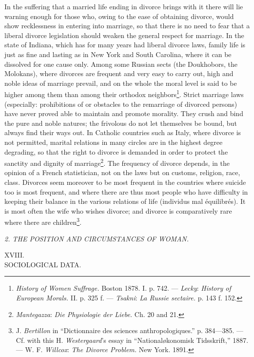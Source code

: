 \documentclass[12pt,a4paper,openany]{book}
\newcommand{\opage}[1]{\marginnote{\footnotesize\textit{[#1]}}}
\newcommand{\grouphead}[1]{\bigskip\begin{center}{\large #1}\end{center}}
\newcounter{etikch}
\newcommand{\chapterhead}[2]{\stepcounter{etikch}\bigskip\begin{center}\pdfbookmark[1]{#1 #2}{etikch.\arabic{etikch}}#1\\[3pt]{\large #2}\end{center}\medskip}
\begin{document}
In the suffering that a married life ending in divorce brings with it there will lie warning enough for those who, owing
to the ease of obtaining divorce, would show recklessness in entering into marriage, so that there is no need to fear
that a liberal divorce legislation should weaken the general respect for marriage. In the state of Indiana, which has
for many years had liberal divorce laws, family life is just as fine and lasting as in New York and South Carolina,
where it can be dissolved for one cause only. Among some Russian sects (the Doukhobors, the Molokans), where divorces are
frequent and very easy to carry out, high and noble ideas of marriage prevail, and on the whole the moral level is said
to be higher among them than among their orthodox neighbors\footnote[1]{\textit{History of Women Suffrage.} Boston 1878.
I. p. 742. --- \emph{Lecky}: \textit{History of European Morals.} II. p. 325 f. --- \emph{Tsakni}: \textit{La Russie
sectaire.} p. 143 f. 152.}. Strict marriage laws (especially:
\opage{310}prohibitions of or obstacles to the remarriage of divorced persons) have never proved able to maintain and
promote morality. They crush and bind the pure and noble natures; the frivolous do not let themselves be bound, but
always find their ways out. In Catholic countries such as Italy, where divorce is not permitted, marital relations in
many circles are in the highest degree degrading, so that the right to divorce is demanded in order to protect the
sanctity and dignity of marriage\footnote[1]{\emph{Mantegazza}: \textit{Die Physiologie der Liebe.} Ch. 20 and 21.}.
The frequency of divorce depends, in the opinion of a French statistician, not on the laws but on customs, religion,
race, class. Divorces seem moreover to be most frequent in the countries where suicide too is most frequent, and where
there are thus most people who have difficulty in keeping their balance in the various relations of life (individus mal
équilibrés). It is most often the wife who wishes divorce; and divorce is comparatively rare where there are
children\footnote[2]{J. \emph{Bertillon} in ``Dictionnaire des sciences anthropologiques.'' p. 384---385. --- Cf. with
this H. \emph{Westergaard}'s essay in ``Nationaløkonomisk Tidsskrift,'' 1887. --- W. F. \emph{Willcox}: \textit{The
Divorce Problem.} New York. 1891.}.

\grouphead{\textit{2. THE POSITION AND CIRCUMSTANCES OF WOMAN.}}

\chapterhead{XVIII.}{SOCIOLOGICAL DATA.}
\end{document}
